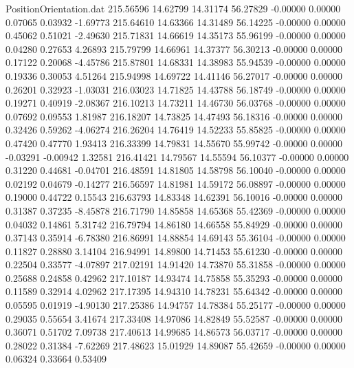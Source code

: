 \begin{filecontents}{PositionOrientation.dat}
 215.56596   14.62799   14.31174    56.27829   -0.00000    0.00000    0.07065    0.03932   -1.69773
 215.64610   14.63366   14.31489    56.14225   -0.00000    0.00000    0.45062    0.51021   -2.49630
 215.71831   14.66619   14.35173    55.96199   -0.00000    0.00000    0.04280    0.27653    4.26893
 215.79799   14.66961   14.37377    56.30213   -0.00000    0.00000    0.17122    0.20068   -4.45786
 215.87801   14.68331   14.38983    55.94539   -0.00000    0.00000    0.19336    0.30053    4.51264
 215.94998   14.69722   14.41146    56.27017   -0.00000    0.00000    0.26201    0.32923   -1.03031
 216.03023   14.71825   14.43788    56.18749   -0.00000    0.00000    0.19271    0.40919   -2.08367
 216.10213   14.73211   14.46730    56.03768   -0.00000    0.00000    0.07692    0.09553    1.81987
 216.18207   14.73825   14.47493    56.18316   -0.00000    0.00000    0.32426    0.59262   -4.06274
 216.26204   14.76419   14.52233    55.85825   -0.00000    0.00000    0.47420    0.47770    1.93413
 216.33399   14.79831   14.55670    55.99742   -0.00000    0.00000   -0.03291   -0.00942    1.32581
 216.41421   14.79567   14.55594    56.10377   -0.00000    0.00000    0.31220    0.44681   -0.04701
 216.48591   14.81805   14.58798    56.10040   -0.00000    0.00000    0.02192    0.04679   -0.14277
 216.56597   14.81981   14.59172    56.08897   -0.00000    0.00000    0.19000    0.44722    0.15543
 216.63793   14.83348   14.62391    56.10016   -0.00000    0.00000    0.31387    0.37235   -8.45878
 216.71790   14.85858   14.65368    55.42369   -0.00000    0.00000    0.04032    0.14861    5.31742
 216.79794   14.86180   14.66558    55.84929   -0.00000    0.00000    0.37143    0.35914   -6.78380
 216.86991   14.88854   14.69143    55.36104   -0.00000    0.00000    0.11827    0.28880    3.14104
 216.94991   14.89800   14.71453    55.61230   -0.00000    0.00000    0.22504    0.33577   -4.07897
 217.02191   14.91420   14.73870    55.31858   -0.00000    0.00000    0.25688    0.24858    0.42962
 217.10187   14.93474   14.75858    55.35293   -0.00000    0.00000    0.11589    0.32914    4.02962
 217.17395   14.94310   14.78231    55.64342   -0.00000    0.00000    0.05595    0.01919   -4.90130
 217.25386   14.94757   14.78384    55.25177   -0.00000    0.00000    0.29035    0.55654    3.41674
 217.33408   14.97086   14.82849    55.52587   -0.00000    0.00000    0.36071    0.51702    7.09738
 217.40613   14.99685   14.86573    56.03717   -0.00000    0.00000    0.28022    0.31384   -7.62269
 217.48623   15.01929   14.89087    55.42659   -0.00000    0.00000    0.06324    0.33664    0.53409

\end{filecontents}

